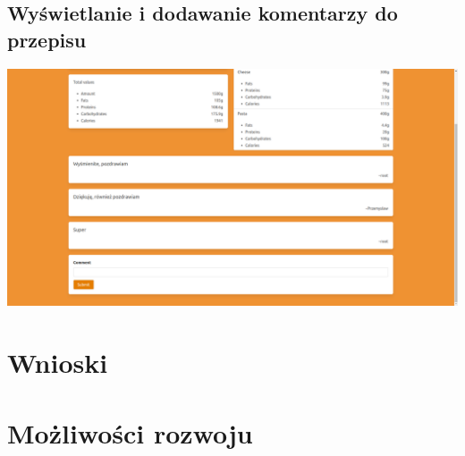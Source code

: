 \documentclass[11pt]{article}
\begin{document}
\subsection{Wyświetlanie i dodawanie komentarzy do przepisu}
\includegraphics[width=15.5cm]{comments.png}

\section{Wnioski}
\section{Możliwości rozwoju}
\end{document}
